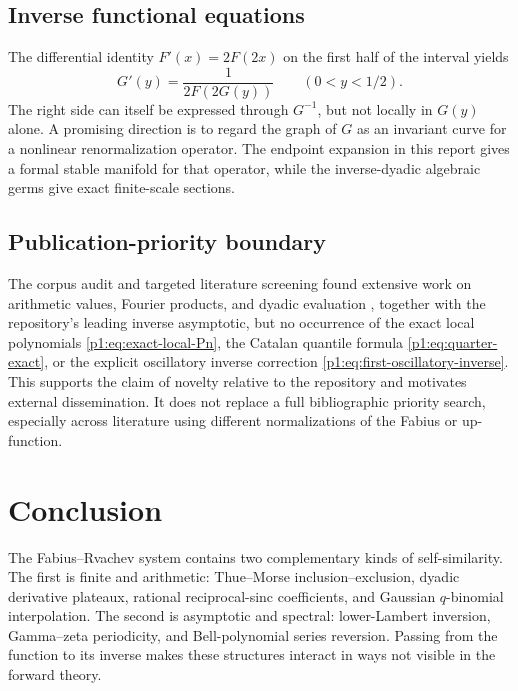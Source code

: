 \documentclass[11pt,oneside]{article}
\numberwithin{equation}{section}
\theoremstyle{definition}
\theoremstyle{remark}
\begin{document}
\subsection{Inverse functional equations}

The differential identity $F'(x)=2F(2x)$ on the first half of the interval yields
\begin{equation}
 G'(y)=\frac1{2F(2G(y))}
 \qquad (0<y<1/2).
 \label{p1:eq:inverse-functional-derivative}
\end{equation}
The right side can itself be expressed through $G^{-1}$, but not locally in $G(y)$ alone.
A promising direction is to regard the graph of $G$ as an invariant curve for a nonlinear
renormalization operator.  The endpoint expansion in this report gives a formal stable
manifold for that operator, while the inverse-dyadic algebraic germs give exact finite-scale
sections.

\subsection{Publication-priority boundary}

The corpus audit and targeted literature screening found extensive work on arithmetic values,
Fourier products, and dyadic evaluation \cite{p1:AriasArithmetic,p1:Haugland2016}, together with the repository's leading inverse asymptotic, but no occurrence of
the exact local polynomials \eqref{p1:eq:exact-local-Pn}, the Catalan quantile formula
\eqref{p1:eq:quarter-exact}, or the explicit oscillatory inverse correction
\eqref{p1:eq:first-oscillatory-inverse}.  This supports the claim of novelty relative to the
repository and motivates external dissemination.  It does not replace a full bibliographic
priority search, especially across literature using different normalizations of the Fabius or
up-function.

\section{Conclusion}
\label{p1:sec:conclusion}

The Fabius--Rvachev system contains two complementary kinds of self-similarity.  The first is
finite and arithmetic: Thue--Morse inclusion--exclusion, dyadic derivative plateaux, rational
reciprocal-sinc coefficients, and Gaussian $q$-binomial interpolation.  The second is
asymptotic and spectral: lower-Lambert inversion, Gamma--zeta periodicity, and Bell-polynomial
series reversion.  Passing from the function to its inverse makes these structures interact in
ways not visible in the forward theory.
\end{document}
